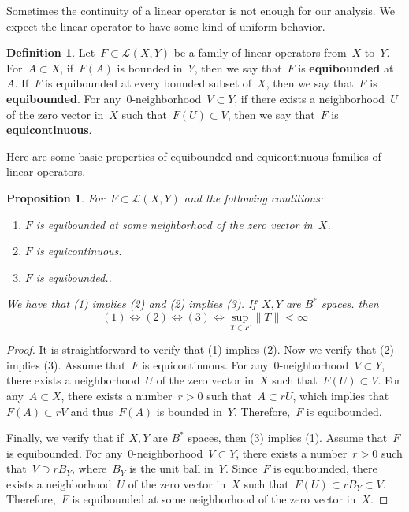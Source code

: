 \documentclass[12pt,a4paper,draft]{article}  %
\newtheorem{proposition}{Proposition}[section]
\theoremstyle{definition}
\newtheorem{definition}{Definition}[section]
\numberwithin{equation}{section}
\begin{document}
Sometimes the continuity of a linear operator is not enough for our analysis.
We expect the linear operator to have some kind of uniform behavior.
\begin{definition}
    Let~$F \subset \mathcal{L}(X,Y)$ be a family of linear operators from~$X$ to~$Y$.
    For~$A \subset X$, if~$F(A)$ is bounded in~$Y$, then we say that~$F$ is \textbf{equibounded} at~$A$.
    If~$F$ is equibounded at every bounded subset of~$X$, then we say that~$F$ is \textbf{equibounded}.
    For any~$0$-neighborhood~$V \subset Y$, if there exists a neighborhood~$U$ of the zero vector in~$X$ such that~$F(U) \subset V$, then we say that~$F$ is \textbf{equicontinuous}.
\end{definition}
Here are some basic properties of equibounded and equicontinuous families of linear operators.
\begin{proposition} \label{prop3.2}
    For~$F \subset \mathcal{L}(X,Y)$ and the following conditions:
    \begin{enumerate}
        \item $F$ is equibounded at some neighborhood of the zero vector in~$X$.
        \item $F$ is equicontinuous.
        \item $F$ is equibounded..
    \end{enumerate}
    We have that (1) implies (2) and (2) implies (3).
    If~$X,Y$ are $B^{*}$ spaces. then
    $$ (1) \Leftrightarrow (2) \Leftrightarrow (3) \Leftrightarrow \sup_{T \in F} \|T\| < \infty $$
\end{proposition}
\begin{proof}
    It is straightforward to verify that (1) implies (2).
    Now we verify that (2) implies (3).
    Assume that~$F$ is equicontinuous.
    For any~$0$-neighborhood~$V \subset Y$, there exists a neighborhood~$U$ of the zero vector in~$X$ such that~$F(U) \subset V$.
    For any~$A \subset X$, there exists a number~$r > 0$ such that~$A \subset rU$, which implies that~$F(A) \subset rV$ and thus~$F(A)$ is bounded in~$Y$.
    Therefore,~$F$ is equibounded.

    Finally, we verify that if~$X,Y$ are $B^{*}$ spaces, then (3) implies (1).
    Assume that~$F$ is equibounded.
    For any~$0$-neighborhood~$V \subset Y$, there exists a number~$r > 0$ such that~$V \supset rB_Y$, where~$B_Y$ is the unit ball in~$Y$.
    Since~$F$ is equibounded, there exists a neighborhood~$U$ of the zero vector in~$X$ such that~$F(U) \subset rB_Y \subset V$.
    Therefore,~$F$ is equibounded at some neighborhood of the zero vector in~$X$.
\end{proof}
\end{document}
